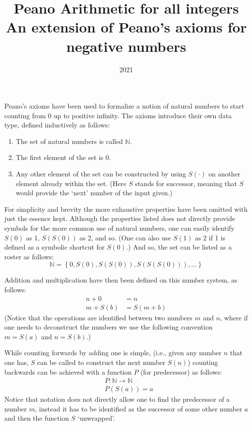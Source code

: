 \documentclass{article}
\title{Peano Arithmetic for all integers\\[4pt]
\large An extension of Peano's axioms for negative numbers}
\author{}
\date{2021}
\newcommand{\N}{\mathbb{N}}
\begin{document}
\maketitle

Peano's axioms have been used to formalize a notion of natural numbers to start counting from 0 up to positive infinity. The axioms introduce their own data type, defined inductively as follows:
\begin{enumerate}
\item The set of natural numbers is called $\mathbb{N}$.
\item The first element of the set is 0.
\item Any other element of the set can be constructed by using $S(\cdot)$ on another element already within the set. (Here $S$ stands for successor, meaning that $S$ would provide the `next' number of the input given.)
\end{enumerate}

For simplicity and brevity the more exhaustive properties have been omitted with just the essence kept. Although the properties listed does not directly provide symbols for the more common use of natural numbers, one can easily identify $S(0)$ as 1, $S(S(0))$ as 2, and so. (One can also use $S(1)$ as 2 if 1 is defined as a symbolic shortcut for $S(0)$.)
And so, the set can be listed as a roster as follows:
\[\mathbb{N} = \left\{0, S(0), S(S(0)), S(S(S(0))), \dots\right\}\]

Addition and multiplication have then been defined on this number system, as follows:
\begin{align}
n + 0 &= n \\
m + S(b) &= S(m + b)
\end{align}
(Notice that the operations are identified between two numbers $m$ and $n$, where if one needs to deconstruct the numbers we use the following convention $m = S(a)$ and $n = S(b)$.)

While counting forwards by adding one is simple, (i.e., given any number $n$ that one has, $S$ can be called to construct the next number $S(n)$) counting backwards can be achieved with a function $P$ (for predecessor) as follows:
\begin{align}
&{} P : \N \to \N \\
&{} P(S(a)) = a
\end{align}
Notice that notation does not directly allow one to find the predecessor of a number $m$, instead it has to be identified as the successor of some other number $a$ and then the function $S$ `unwrapped'.
\end{document}
